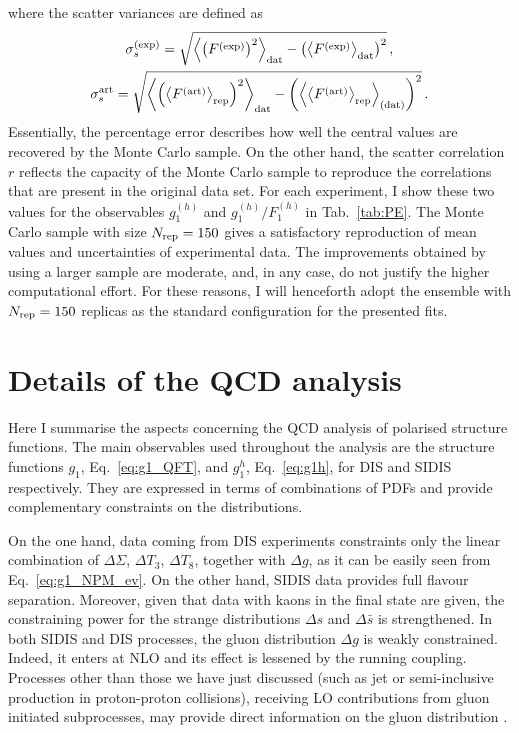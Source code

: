 where the scatter variances are defined as
\begin{gather}
  \sigma^{\textrm{(exp)}}_s = \sqrt{\left< \left( F^{\textrm{(exp)}} \right)^2 \right>_{\textrm{dat}} - \left( \left< F^{\textrm{(exp)}} \right>_{\textrm{dat}} \right)^2} \,,\\
  \sigma^{\textrm{art}}_s = \sqrt{\left< \left( \left<F^{\textrm{(art)}}\right>_{\textrm{rep}} \right)^2 \right>_{\textrm{dat}} - \left( \left< \left<F^{\textrm{(art)}}\right>_{\textrm{rep}} \right>_{\textrm{(dat)}} \right)^2} \,.
\end{gather}
Essentially, the percentage error describes how well the central values are recovered by the Monte Carlo sample. On the other hand, the scatter correlation $r$ reflects the capacity of the Monte Carlo sample to reproduce the correlations that are present in the original data set. For each experiment, I show these two values for the observables $g_1^{(h)}$ and $g_1^{(h)}/F_1^{(h)}$ in Tab.~\ref{tab:PE}. The Monte Carlo sample with size $N_{\textrm{rep}} = 150$ gives a satisfactory reproduction of mean values and uncertainties of experimental data. The improvements obtained by using a larger sample are moderate, and, in any case, do not justify the higher computational effort. For these reasons, I will henceforth adopt the ensemble with $N_{\textrm{rep}} = 150$ replicas as the standard configuration for the presented fits.

\section{Details of the QCD analysis}
\label{sec:4.2}
Here I summarise the aspects concerning the QCD analysis of polarised structure functions. The main observables used throughout the analysis are the structure functions $g_1$, Eq.~\eqref{eq:g1_QFT}, and $g_1^h$, Eq.~\eqref{eq:g1h}, for DIS and SIDIS respectively. They are expressed in terms of combinations of PDFs and provide complementary constraints on the distributions.%

On the one hand, data coming from DIS experiments constraints only the linear combination of $\Delta \Sigma$, $\Delta T_3$, $\Delta T_8$, together with $\Delta g$, as it can be easily seen from Eq.~\eqref{eq:g1_NPM_ev}. On the other hand, SIDIS data provides full flavour separation. Moreover, given that data with kaons in the final state are given, the constraining power for the strange distributions $\Delta s$ and $\Delta \bar{s}$ is strengthened. In both SIDIS and DIS processes, the gluon distribution $\Delta g$ is weakly constrained. Indeed, it enters at NLO and its effect is lessened by the running coupling. Processes other than those we have just discussed (such as jet or semi-inclusive production in proton-proton collisions), receiving LO contributions from gluon initiated subprocesses, may provide direct information on the gluon distribution \cite{Rojo:2015acz}.%

